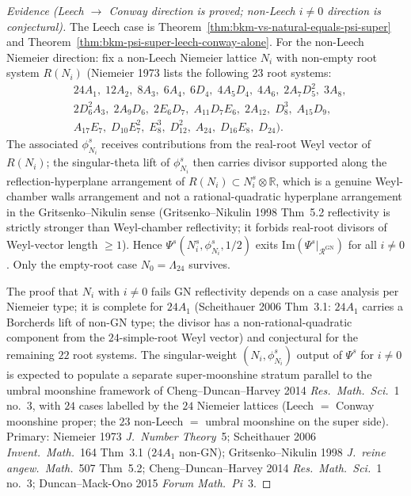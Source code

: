 \begin{proof}[Evidence (Leech $\to$ Conway direction is proved; non-Leech $i\ne 0$ direction is conjectural)]
The Leech case is Theorem~\ref{thm:bkm-vs-natural-equals-psi-super}
and Theorem~\ref{thm:bkm-psi-super-leech-conway-alone}. For the
non-Leech Niemeier direction: fix a non-Leech Niemeier lattice
$N_{i}$ with non-empty root system $R(N_{i})$ (Niemeier 1973 lists
the following 23 root systems:
\[
\begin{aligned}
&24A_{1},\;12A_{2},\;8A_{3},\;6A_{4},\;6D_{4},\;4A_{5}D_{4},\;
4A_{6},\;2A_{7}D_{5}^{2},\;3A_{8}, \\
&2D_{6}^{2}A_{3},\;2A_{9}D_{6},\;
2E_{6}D_{7},\;A_{11}D_{7}E_{6},\;2A_{12},\;D_{8}^{3},\;A_{15}D_{9}, \\
&A_{17}E_{7},\;D_{10}E_{7}^{2},\;E_{8}^{3},\;D_{12}^{2},\;
A_{24},\;D_{16}E_{8},\;D_{24}).
\end{aligned}
\] The associated $\phi^{s}_{N_{i}}$
receives contributions from the real-root Weyl vector of
$R(N_{i})$; the singular-theta lift of $\phi^{s}_{N_{i}}$ then
carries divisor supported along the reflection-hyperplane
arrangement of $R(N_{i})\subset N_{i}^{s}\otimes\mathbb R$, which
is a genuine Weyl-chamber walls arrangement and not a
rational-quadratic hyperplane arrangement in the Gritsenko--Nikulin
sense (Gritsenko--Nikulin 1998 Thm~5.2 reflectivity is strictly
stronger than Weyl-chamber reflectivity; it forbids real-root
divisors of Weyl-vector length $\ge 1$). Hence
$\Psi^{s}(N_{i}^{s},\phi^{s}_{N_{i}},1/2)$ exits
$\mathrm{Im}(\Psi^{s}|_{\mathcal R^{\mathrm{GN}}})$ for all
$i\ne 0$. Only the empty-root case $N_{0} = \Lambda_{24}$ survives.

The proof that $N_{i}$ with $i\ne 0$ fails GN reflectivity
depends on a case analysis per Niemeier type; it is complete for
$24A_{1}$ (Scheithauer 2006 Thm~3.1: $24A_{1}$ carries a Borcherds
lift of non-GN type; the divisor has a non-rational-quadratic
component from the $24$-simple-root Weyl vector) and conjectural
for the remaining $22$ root systems. The singular-weight
$(N_{i},\phi^{s}_{N_{i}})$ output of $\Psi^{s}$ for $i\ne 0$
is expected to populate a separate super-moonshine stratum
parallel to the umbral moonshine framework of Cheng--Duncan--Harvey
2014 \emph{Res.\ Math.\ Sci.}~1 no.~3, with $24$ cases labelled by
the $24$ Niemeier lattices (Leech $=$ Conway moonshine proper; the
$23$ non-Leech $=$ umbral moonshine on the super side). Primary:
Niemeier 1973 \emph{J.\ Number Theory}~5; Scheithauer 2006
\emph{Invent.\ Math.}~164 Thm~3.1 ($24A_{1}$ non-GN); Gritsenko--Nikulin
1998 \emph{J.\ reine angew.\ Math.}~507 Thm~5.2; Cheng--Duncan--Harvey
2014 \emph{Res.\ Math.\ Sci.}~1 no.~3; Duncan--Mack-Ono 2015
\emph{Forum Math.~Pi}~3.
\end{proof}

